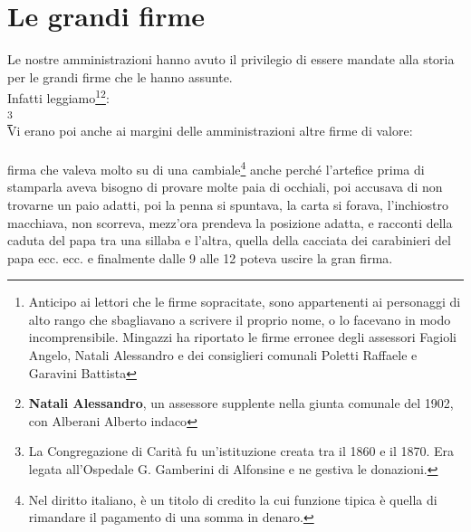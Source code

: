 
\chapter{Le grandi firme}
Le nostre amministrazioni hanno avuto il privilegio di essere mandate alla storia per le grandi firme che le hanno assunte.\\
Infatti leggiamo\footnote{Anticipo ai lettori che le firme sopracitate, sono appartenenti ai personaggi di alto rango che sbagliavano a scrivere il proprio nome, o lo facevano in modo incomprensibile. Mingazzi ha riportato le firme erronee degli assessori Fagioli Angelo, Natali Alessandro e dei consiglieri comunali Poletti Raffaele e Garavini Battista}\footnote{\textbf{Natali Alessandro}, un assessore supplente nella giunta comunale del 1902, con Alberani Alberto indaco}:
\\   
\normalfont
\footnote{La Congregazione di Carità fu un'istituzione creata tra il 1860 e il 1870. Era legata all'Ospedale G. Gamberini di Alfonsine e ne gestiva le donazioni.}\\
\indent Vi erano poi anche ai margini delle amministrazioni altre firme di valore:
\\ \\
\normalfont
firma che valeva molto su di una cambiale\footnote{Nel diritto italiano, è un titolo di credito la cui funzione tipica è quella di rimandare il pagamento di una somma in denaro.} anche perché l'artefice prima di stamparla aveva bisogno di provare molte paia di occhiali, poi accusava di non trovarne un paio adatti, poi la penna si spuntava, la carta si forava, l'inchiostro macchiava, non scorreva, mezz'ora prendeva la posizione adatta, e racconti della caduta del papa tra una sillaba e l'altra, quella della cacciata dei carabinieri del papa ecc. ecc. e finalmente dalle 9 alle 12 poteva uscire la gran firma. \\

